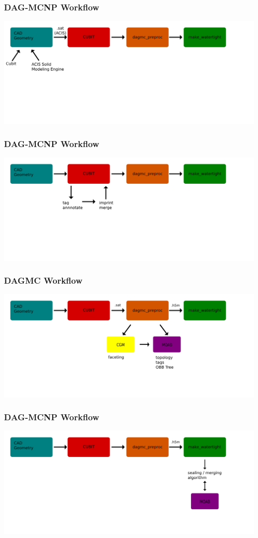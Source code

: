\documentclass[14pt]{beamer}
\begin{document}
\begin{frame}
\frametitle{DAG-MCNP Workflow}
\includegraphics[scale=0.25, trim = 40 400 0 0]{DAGMC_Wrkflw2.png}
\end{frame}

\begin{frame}
\frametitle{DAG-MCNP Workflow}
\includegraphics[scale=0.25, trim = 40 400 0 0 ]{DAGMC_Wrkflw3.png}
\end{frame}

\begin{frame}
\frametitle{DAGMC Workflow}
\includegraphics[scale=0.25, trim = 40 400 0 0]{DAGMC_Wrkflw4.png}
\end{frame}


\begin{frame}
\frametitle{DAG-MCNP Workflow}
\includegraphics[scale=0.25, trim = 40 400 0 0]{DAGMC_Wrkflw5.png}
\end{frame}
\end{document}
